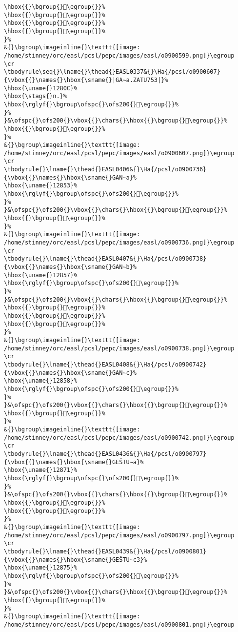 \begin{verbatim}
\hbox{{}\bgroup{}𒠋\egroup{}}%
\hbox{{}\bgroup{}𒠍\egroup{}}%
\hbox{{}\bgroup{}𒠎\egroup{}}%
\hbox{{}\bgroup{}𒠏\egroup{}}%
}%
&{}\bgroup\imageinline{}\texttt{[image: /home/stinney/orc/easl/pcsl/pepc/images/easl/o0900599.png]}\egroup
\cr
\tbodyrule\seq{}\lname{}\thead{}EASL0337&{}\Ha{/pcsl/o0900607}{\vbox{{}\names{}\hbox{\sname{}|GA∼a.ZATU753|}%
\hbox{\uname{}1280C}%
\hbox{\stags{}n.}%
\hbox{\rglyf{}\bgroup\ofspc{}\ofs200{}𒠌\egroup{}}%
}%
}&\ofspc{}\ofs200{}\vbox{{}\chars{}\hbox{{}\bgroup{}𒠌\egroup{}}%
\hbox{{}\bgroup{}𒠐\egroup{}}%
}%
&{}\bgroup\imageinline{}\texttt{[image: /home/stinney/orc/easl/pcsl/pepc/images/easl/o0900607.png]}\egroup
\cr
\tbodyrule{}\lname{}\thead{}EASL0406&{}\Ha{/pcsl/o0900736}{\vbox{{}\names{}\hbox{\sname{}GAN∼a}%
\hbox{\uname{}12853}%
\hbox{\rglyf{}\bgroup\ofspc{}\ofs200{}𒡓\egroup{}}%
}%
}&\ofspc{}\ofs200{}\vbox{{}\chars{}\hbox{{}\bgroup{}𒡒\egroup{}}%
\hbox{{}\bgroup{}𒡓\egroup{}}%
}%
&{}\bgroup\imageinline{}\texttt{[image: /home/stinney/orc/easl/pcsl/pepc/images/easl/o0900736.png]}\egroup
\cr
\tbodyrule{}\lname{}\thead{}EASL0407&{}\Ha{/pcsl/o0900738}{\vbox{{}\names{}\hbox{\sname{}GAN∼b}%
\hbox{\uname{}12857}%
\hbox{\rglyf{}\bgroup\ofspc{}\ofs200{}𒡗\egroup{}}%
}%
}&\ofspc{}\ofs200{}\vbox{{}\chars{}\hbox{{}\bgroup{}𒡔\egroup{}}%
\hbox{{}\bgroup{}𒡕\egroup{}}%
\hbox{{}\bgroup{}𒡖\egroup{}}%
\hbox{{}\bgroup{}𒡗\egroup{}}%
}%
&{}\bgroup\imageinline{}\texttt{[image: /home/stinney/orc/easl/pcsl/pepc/images/easl/o0900738.png]}\egroup
\cr
\tbodyrule{}\lname{}\thead{}EASL0408&{}\Ha{/pcsl/o0900742}{\vbox{{}\names{}\hbox{\sname{}GAN∼c}%
\hbox{\uname{}12858}%
\hbox{\rglyf{}\bgroup\ofspc{}\ofs200{}𒡘\egroup{}}%
}%
}&\ofspc{}\ofs200{}\vbox{{}\chars{}\hbox{{}\bgroup{}𒡘\egroup{}}%
\hbox{{}\bgroup{}𒡠\egroup{}}%
}%
&{}\bgroup\imageinline{}\texttt{[image: /home/stinney/orc/easl/pcsl/pepc/images/easl/o0900742.png]}\egroup
\cr
\tbodyrule{}\lname{}\thead{}EASL0436&{}\Ha{/pcsl/o0900797}{\vbox{{}\names{}\hbox{\sname{}GEŠTU∼a}%
\hbox{\uname{}12871}%
\hbox{\rglyf{}\bgroup\ofspc{}\ofs200{}𒡱\egroup{}}%
}%
}&\ofspc{}\ofs200{}\vbox{{}\chars{}\hbox{{}\bgroup{}𒡱\egroup{}}%
\hbox{{}\bgroup{}𒡲\egroup{}}%
\hbox{{}\bgroup{}𒡳\egroup{}}%
}%
&{}\bgroup\imageinline{}\texttt{[image: /home/stinney/orc/easl/pcsl/pepc/images/easl/o0900797.png]}\egroup
\cr
\tbodyrule{}\lname{}\thead{}EASL0439&{}\Ha{/pcsl/o0900801}{\vbox{{}\names{}\hbox{\sname{}GEŠTU∼c3}%
\hbox{\uname{}12875}%
\hbox{\rglyf{}\bgroup\ofspc{}\ofs200{}𒡵\egroup{}}%
}%
}&\ofspc{}\ofs200{}\vbox{{}\chars{}\hbox{{}\bgroup{}𒡵\egroup{}}%
\hbox{{}\bgroup{}𒡶\egroup{}}%
}%
&{}\bgroup\imageinline{}\texttt{[image: /home/stinney/orc/easl/pcsl/pepc/images/easl/o0900801.png]}\egroup

\end{verbatim}
